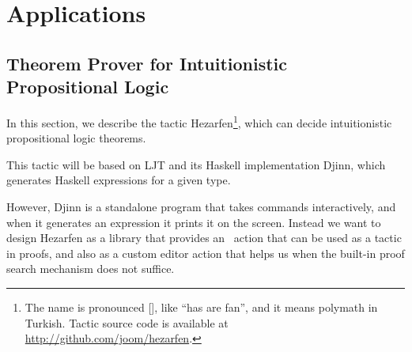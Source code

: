 \section{Applications} \label{sec:applications}

\subsection{Theorem Prover for Intuitionistic Propositional Logic}\label{ssec:hezarfen}

In this section, we describe the tactic Hezarfen\footnote{ The name is
  pronounced {[]}, like ``has are fan'', and it means
    polymath in Turkish.  Tactic source code is available at
    \url{http://github.com/joom/hezarfen}.}, which can decide intuitionistic
propositional logic theorems.

This tactic will be based on LJT\cite{ljt} and its Haskell
implementation Djinn\cite{djinn}, which generates Haskell expressions
for a given type.

However, Djinn is a standalone program that takes commands
interactively, and when it generates an expression it prints it on the screen.
Instead we want to design Hezarfen as a library that provides an \Elab\ action
that can be used as a tactic in proofs, and also as a custom editor action that
helps us when the built-in proof search mechanism does not suffice.





